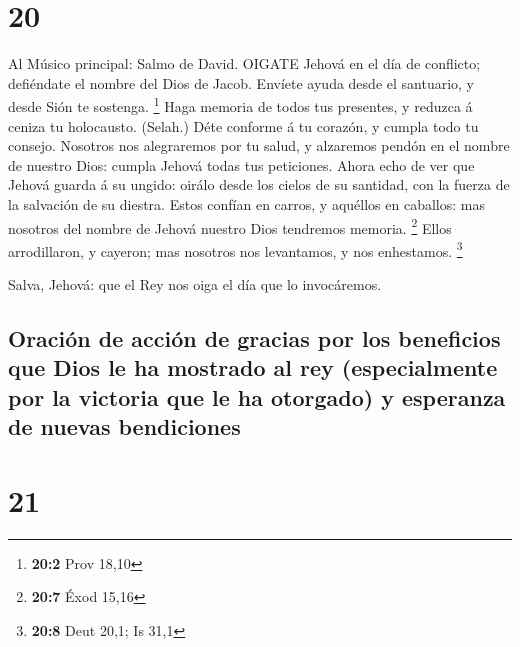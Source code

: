\hypertarget{section-19}{%
\section{20}\label{section-19}}

 Al Músico principal: Salmo de David. OIGATE Jehová en el
día de conflicto; defiéndate el nombre del Dios de Jacob. 
Envíete ayuda desde el santuario, y desde Sión te sostenga. \footnote{\textbf{20:2}
  Prov 18,10}  Haga memoria de todos tus presentes, y
reduzca á ceniza tu holocausto. (Selah.)  Déte conforme á tu
corazón, y cumpla todo tu consejo.  Nosotros nos alegraremos
por tu salud, y alzaremos pendón en el nombre de nuestro Dios: cumpla
Jehová todas tus peticiones.  Ahora echo de ver que Jehová
guarda á su ungido: oirálo desde los cielos de su santidad, con la
fuerza de la salvación de su diestra.  Estos confían en
carros, y aquéllos en caballos: mas nosotros del nombre de Jehová
nuestro Dios tendremos memoria. \footnote{\textbf{20:7} Éxod 15,16}
 Ellos arrodillaron, y cayeron; mas nosotros nos levantamos,
y nos enhestamos. \footnote{\textbf{20:8} Deut 20,1; Is 31,1}

 Salva, Jehová: que el Rey nos oiga el día que lo
invocáremos.

\hypertarget{oraciuxf3n-de-acciuxf3n-de-gracias-por-los-beneficios-que-dios-le-ha-mostrado-al-rey-especialmente-por-la-victoria-que-le-ha-otorgado-y-esperanza-de-nuevas-bendiciones}{%
\subsection{Oración de acción de gracias por los beneficios que Dios le
ha mostrado al rey (especialmente por la victoria que le ha otorgado) y
esperanza de nuevas
bendiciones}\label{oraciuxf3n-de-acciuxf3n-de-gracias-por-los-beneficios-que-dios-le-ha-mostrado-al-rey-especialmente-por-la-victoria-que-le-ha-otorgado-y-esperanza-de-nuevas-bendiciones}}

\hypertarget{section-20}{%
\section{21}\label{section-20}}

